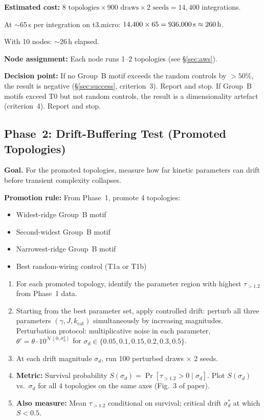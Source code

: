 \documentclass[aps,prl,twocolumn,superscriptaddress,floatfix]{revtex4-2}
\newcommand{\tauexp}{\tau_{>1.2}}
\newcommand{\kcat}{k_{\mathrm{cat}}}
\begin{document}
\textbf{Estimated cost:}
$8 \text{ topologies} \times 900 \text{ draws} \times 2 \text{ seeds}
= 14{,}400$ integrations.

At $\sim$65\,s per integration on t3.micro:
$14{,}400 \times 65 = 936{,}000\text{\,s} \approx 260\text{\,h}$.

With 10 nodes: $\sim$26\,h elapsed.

\textbf{Node assignment:}  Each node runs 1--2 topologies
(see \S\ref{sec:aws}).

\textbf{Decision point:}  If no Group~B motif exceeds the
random controls by $> 50\%$, the result is negative
(\S\ref{sec:success}, criterion~3).  Report and stop.
If Group~B motifs exceed T0 but not random controls, the result
is a dimensionality artefact (criterion~4).  Report and stop.

\subsection{Phase~2: Drift-Buffering Test (Promoted Topologies)}
\label{sec:phase2}

\textbf{Goal.}  For the promoted topologies, measure how far
kinetic parameters can drift before transient complexity
collapses.

\textbf{Promotion rule:}  From Phase~1, promote 4 topologies:
\begin{itemize}
  \item Widest-ridge Group~B motif
  \item Second-widest Group~B motif
  \item Narrowest-ridge Group~B motif
  \item Best random-wiring control (T1a or T1b)
\end{itemize}

\begin{enumerate}[label=2.\arabic*]
  \item For each promoted topology, identify the parameter
    region with highest $\tauexp$ from Phase~1 data.

  \item Starting from the best parameter set, apply controlled
    drift: perturb all three parameters $(\gamma, J, \kcat)$
    simultaneously by increasing magnitudes.  Perturbation
    protocol: multiplicative noise in each parameter,
    $\theta' = \theta \cdot 10^{\mathcal{N}(0, \sigma_d^2)}$
    for $\sigma_d \in \{0.05, 0.1, 0.15, 0.2, 0.3, 0.5\}$.

  \item At each drift magnitude $\sigma_d$, run 100 perturbed
    draws $\times$ 2 seeds.

  \item \textbf{Metric:}  Survival probability
    $S(\sigma_d) = \Pr[\tauexp > 0 \mid \sigma_d]$.
    Plot $S(\sigma_d)$ vs.\ $\sigma_d$ for all 4 topologies
    on the same axes (Fig.~3 of paper).

  \item \textbf{Also measure:}  Mean $\tauexp$ conditional
    on survival; critical drift $\sigma_d^*$ at which
    $S < 0.5$.
\end{enumerate}
\end{document}
